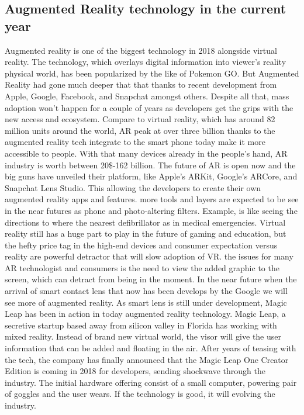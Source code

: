 \documentclass[12pt]{article}
\begin{document}
\subsection{Augmented Reality technology in the current year}
Augmented reality is one of the biggest technology in 2018 \cite{some99} alongside virtual reality. The technology, which overlays digital information into viewer's reality physical world, has been popularized by the like of Pokemon GO. But Augmented Reality had gone much deeper that that thanks to recent development from Apple, Google, Facebook, and Snapchat amongst others. Despite all that, mass adoption won't happen for a couple of years as developers get the grips with the new access and ecosystem. Compare to virtual reality, which has around 82 million units around the world, AR peak at over three billion thanks to the augmented reality tech integrate to the smart phone today make it more accessible to people. With that many devices already in the people's hand, AR industry is worth between 20\$-162 billion. The future of AR is open now and the big guns have unveiled their platform, like Apple's ARKit, Google's ARCore, and Snapchat Lens Studio. This allowing the developers to create their own augmented reality apps and features. more tools and layers are expected to be see in the near futures as phone and photo-altering filters. Example, is like seeing the directions to where the nearest defibrillator as in medical emergencies. Virtual reality still has a huge part to play in the future of gaming and education, but the hefty price tag in the high-end devices and consumer expectation versus reality are powerful detractor that will slow adoption of VR. the issues for many AR technologist and consumers is the need to view the added graphic to the screen, which can detract from being in the moment. In the near future when the arrival of smart contact lens that now has been develops by the Google we will see more of augmented reality. As smart lens is still under development, Magic Leap has been in action in today augmented reality technology. Magic Leap, a secretive startup based away from silicon valley in Florida has working with mixed reality. Instead of brand new virtual world, the visor will give the user information that can be added and floating in the air. After years of teasing with the tech, the company has finally announced that the Magic Leap One Creator Edition is coming in 2018 for developers, sending shockwave through the industry. The initial hardware offering consist of a small computer, powering pair of goggles and the user wears. If the technology is good, it will evolving the industry. 
\end{document}
